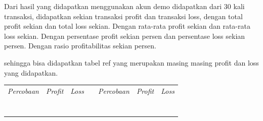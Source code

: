 
Dari hasil yang didapatkan menggunakan akun demo didapatkan dari 30 kali transaksi, didapatkan sekian transaksi profit dan transaksi loss, dengan total profit sekian dan total loss sekian. Dengan rata-rata profit sekian dan rata-rata loss sekian. Dengan persentase profit sekian persen dan persentase loss sekian persen. Dengan rasio profitabilitas sekian persen.

sehingga bisa didapatkan tabel ref yang merupakan masing masing profit dan loss yang didapatkan. 

\begin{table}[H]
  \centering
  \begin{tabular}{|c|c|l|l|l|l|l|}
  \cline{1-3} \cline{5-7}
  \textit{Percobaan}     & \textit{Profit}       & \textit{Loss} &  & \multicolumn{1}{c|}{\textit{Percobaan}} & \multicolumn{1}{c|}{\textit{Profit}} & \textit{Loss} \\ \cline{1-3} \cline{5-7} 
                         &                       &               &  &                                         &                                      &               \\ \cline{1-3} \cline{5-7} 
                         &                       &               &  &                                         &                                      &               \\ \cline{1-3} \cline{5-7} 
                         &                       &               &  &                                         &                                      &               \\ \cline{1-3} \cline{5-7} 
                         &                       &               &  &                                         &                                      &               \\ \cline{1-3} \cline{5-7} 
                         &                       &               &  &                                         &                                      &               \\ \cline{1-3} \cline{5-7} 
                         &                       &               &  &                                         &                                      &               \\ \cline{1-3} \cline{5-7} 
                         &                       &               &  &                                         &                                      &               \\ \cline{1-3} \cline{5-7} 

\end{tabular}
\end{table}
